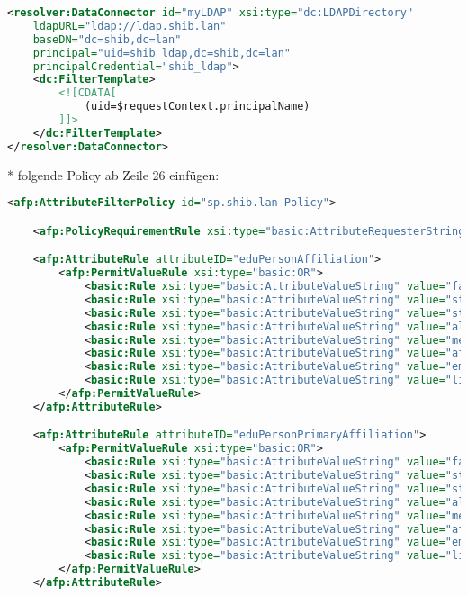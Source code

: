 \begin{lstlisting}[language=xml]
<resolver:DataConnector id="myLDAP" xsi:type="dc:LDAPDirectory"
	ldapURL="ldap://ldap.shib.lan" 
	baseDN="dc=shib,dc=lan" 
	principal="uid=shib_ldap,dc=shib,dc=lan"
	principalCredential="shib_ldap">
	<dc:FilterTemplate>
		<![CDATA[
			(uid=$requestContext.principalName)
		]]>
	</dc:FilterTemplate>
</resolver:DataConnector>
\end{lstlisting}	
* folgende Policy ab Zeile 26 einfügen:
\begin{lstlisting}[language=xml]
<afp:AttributeFilterPolicy id="sp.shib.lan-Policy">

	<afp:PolicyRequirementRule xsi:type="basic:AttributeRequesterString" value="https://sp.shib.lan/shibboleth" />

	<afp:AttributeRule attributeID="eduPersonAffiliation">
		<afp:PermitValueRule xsi:type="basic:OR">
			<basic:Rule xsi:type="basic:AttributeValueString" value="faculty" ignoreCase="true" />
			<basic:Rule xsi:type="basic:AttributeValueString" value="student" ignoreCase="true" />
			<basic:Rule xsi:type="basic:AttributeValueString" value="staff" ignoreCase="true" />
			<basic:Rule xsi:type="basic:AttributeValueString" value="alum" ignoreCase="true" />
			<basic:Rule xsi:type="basic:AttributeValueString" value="member" ignoreCase="true" />
			<basic:Rule xsi:type="basic:AttributeValueString" value="affiliate" ignoreCase="true" />
			<basic:Rule xsi:type="basic:AttributeValueString" value="employee" ignoreCase="true" />
			<basic:Rule xsi:type="basic:AttributeValueString" value="library-walk-in" ignoreCase="true" />
		</afp:PermitValueRule>
	</afp:AttributeRule>

	<afp:AttributeRule attributeID="eduPersonPrimaryAffiliation">
		<afp:PermitValueRule xsi:type="basic:OR">
			<basic:Rule xsi:type="basic:AttributeValueString" value="faculty" ignoreCase="true" />
			<basic:Rule xsi:type="basic:AttributeValueString" value="student" ignoreCase="true" />
			<basic:Rule xsi:type="basic:AttributeValueString" value="staff" ignoreCase="true" />
			<basic:Rule xsi:type="basic:AttributeValueString" value="alum" ignoreCase="true" />
			<basic:Rule xsi:type="basic:AttributeValueString" value="member" ignoreCase="true" />
			<basic:Rule xsi:type="basic:AttributeValueString" value="affiliate" ignoreCase="true" />
			<basic:Rule xsi:type="basic:AttributeValueString" value="employee" ignoreCase="true" />
			<basic:Rule xsi:type="basic:AttributeValueString" value="library-walk-in" ignoreCase="true" />
		</afp:PermitValueRule>
	</afp:AttributeRule>
	

\end{lstlisting}
